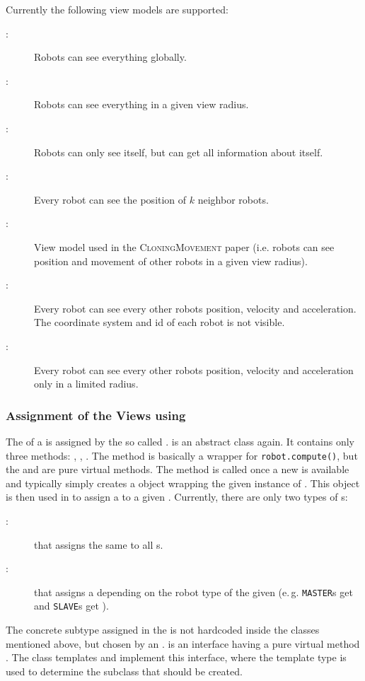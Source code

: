 \noindent
Currently the following view models are supported:
\begin{description}
\item[:] Robots can see everything globally.
\item[:] Robots can see everything in a given view radius.
\item[:] Robots can only see itself, but can get all information about itself.
\item[:] Every robot can see the position of $k$ neighbor robots.
\item[:] View model used in the \textsc{CloningMovement} paper (i.e. robots can see position and movement of other robots in a given view radius).
\item[:] Every robot can see every other robots position, velocity and acceleration. The coordinate system and id of each robot is not visible.
\item[:] Every robot can see every other robots position, velocity and acceleration only in a limited radius.
\end{description}

\subsubsection{Assignment of the Views using }
The  of a  is assigned by the so called .  is an abstract class again. It contains only three methods: , , . The  method is basically a wrapper for \texttt{robot.compute()}, but the  and  are pure virtual methods. The  method is called once a new  is available and typically simply creates a  object wrapping the given instance of . This  object is then used in  to assign a  to a given . Currently, there are only two types of s:
\begin{description}
\item[:]  that assigns the same  to all s. 
\item[:]  that assigns a  depending on the robot type of the given  (e.\,g. \texttt{MASTER}s get  and \texttt{SLAVE}s get ).
\end{description}
The concrete  subtype assigned in the  is not hardcoded inside the classes mentioned above, but chosen by an .  is an interface having a pure virtual method . The class templates  and  implement this interface, where the template type is used to determine the  subclass that should be created.


